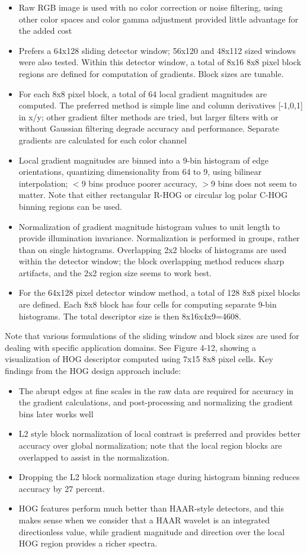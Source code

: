 \begin{itemize}
\item Raw RGB image is used with no color correction or noise filtering,
using other color spaces and color gamma adjustment provided
little advantage for the added cost
\item Prefers a 64x128 sliding detector window; 56x120 and 48x112
sized windows were also tested. Within this detector window, a
total of 8x16 8x8 pixel block regions are defined for computation
of gradients. Block sizes are tunable.
\item For each 8x8 pixel block, a total of 64 local gradient magnitudes
are computed. The preferred method is simple line and column
derivatives [-1,0,1] in x/y; other gradient filter methods are tried,
but larger filters with or without Gaussian filtering degrade
accuracy and performance. Separate gradients are calculated for
each color channel
\item Local gradient magnitudes are binned into a 9-bin histogram of
edge orientations, quantizing dimensionality from 64 to 9, using
bilinear interpolation; $<$9 bins produce poorer accuracy, $>$9 bins
does not seem to matter. Note that either rectangular R-HOG or
circular log polar C-HOG binning regions can be used.
\item Normalization of gradient magnitude histogram values to
unit length to provide illumination invariance. Normalization
is performed in groups, rather than on single histograms.
Overlapping 2x2 blocks of histograms are used within the detector
window; the block overlapping method reduces sharp artifacts,
and the 2x2 region size seems to work best.
\item For the 64x128 pixel detector window method, a total of 128
8x8 pixel blocks are defined. Each 8x8 block has four cells for
computing separate 9-bin histograms. The total descriptor size is
then 8x16x4x9=4608.
\end{itemize}
Note that various formulations of the sliding window and block sizes are used for
dealing with specific application domains. See Figure 4-12, showing a visualization of
HOG descriptor computed using 7x15 8x8 pixel cells. Key findings from the HOG \cite{g}
design approach include:
\begin{itemize}
\item The abrupt edges at fine scales in the raw data are required for
accuracy in the gradient calculations, and post-processing and
normalizing the gradient bins later works well
\item L2 style block normalization of local contrast is preferred and
provides better accuracy over global normalization; note that the
local region blocks are overlapped to assist in the normalization.
\item Dropping the L2 block normalization stage during histogram
binning reduces accuracy by 27 percent.
\item HOG features perform much better than HAAR-style detectors,
and this makes sense when we consider that a HAAR wavelet is
an integrated directionless value, while gradient magnitude and
direction over the local HOG region provides a richer spectra.

\end{itemize}

